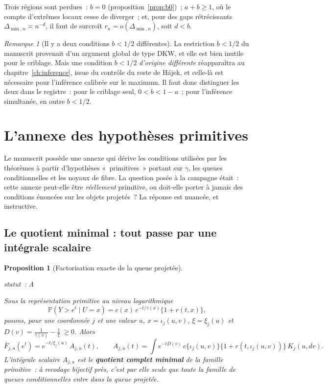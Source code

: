 \documentclass[11pt]{article}
\theoremstyle{plain}
\newtheorem{proposition}[theoreme]{Proposition}
\theoremstyle{definition}
\theoremstyle{remark}
\newtheorem{remarque}[theoreme]{Remarque}
\newcommand{\Pp}{\mathbb P}
\newcommand{\1}{\mathbf 1}
\newcommand{\statut}[1]{%
  \nopagebreak\par\nopagebreak
  \hfill{\normalfont\footnotesize\textcolor{gris}{statut~: #1}}%
  \par\nopagebreak\vspace{-2pt}}
\begin{document}
\noindent
Trois régions sont perdues~: $b=0$ (proposition~\ref{prop:b0})~;
$a+b\ge1$, où le compte d'extrêmes locaux cesse de diverger~; et, pour
des gaps rétrécissants $\Delta_{\min,n}\asymp n^{-d}$, il faut de surcroît
$r_n=o(\Delta_{\min,n})$, soit $d<b$.

\begin{remarque}[Il y a deux conditions $b<1/2$ différentes]
\label{rem:deux-b}
La restriction $b<1/2$ du manuscrit provenait d'un argument global de
type DKW, et elle est bien inutile pour le criblage. Mais une condition
$b<1/2$ \emph{d'origine différente} réapparaîtra au
chapitre~\ref{ch:inference}, issue du contrôle du reste de Hájek, et
celle-là est nécessaire pour l'inférence calibrée sur le maximum. Il faut
donc distinguer les deux dans le registre~: pour le criblage seul,
$0<b<1-a$~; pour l'inférence simultanée, en outre $b<1/2$.
\end{remarque}

\clearpage

\section{L'annexe des hypothèses primitives}\label{ch:primitif}

Le manuscrit possède une annexe qui dérive les conditions utilisées par
les théorèmes à partir d'hypothèses «~primitives~» portant sur $\gamma$,
les queues conditionnelles et les noyaux de fibre. La question posée à la
campagne était~: cette annexe peut-elle être \emph{réellement} primitive,
ou doit-elle porter à jamais des conditions énoncées sur les objets
projetés~? La réponse est nuancée, et instructive.

\subsection{Le quotient minimal : tout passe par une intégrale scalaire}

\begin{proposition}[Factorisation exacte de la queue projetée]
\label{prop:factorisation}
\statut{A}
Sous la représentation primitive au niveau logarithmique
\[
 \Pp(Y>e^t\mid U=x)=c(x)\,e^{-t/\gamma(x)}\{1+r(t,x)\},
\]
posons, pour une coordonnée $j$ et une valeur $u$,
$x=\iota_j(u,v)$, $\xi=\xi_j(u)$ et
$D(v)=\frac1{\gamma(x)}-\frac1\xi\ \ge0$. Alors
\begin{equation}
 \bar F_{j,u}(e^t)=e^{-t/\xi_j(u)}\,A_{j,u}(t),
 \qquad
 A_{j,u}(t)=\int e^{-tD(v)}\,c\{\iota_j(u,v)\}\{1+r(t,\iota_j(u,v))\}\,K_j(u,dv).
 \label{eq:facto}
\end{equation}
L'intégrale scalaire $A_{j,u}$ est le \textbf{quotient complet minimal}
de la famille primitive~: à recodage bijectif près, c'est par elle seule
que toute la famille de queues conditionnelles entre dans la queue
projetée.
\end{proposition}
\end{document}
